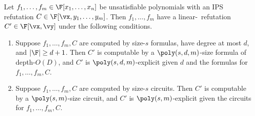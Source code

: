\documentclass{toc}
\begin{document}
\begin{proposition}\label{res:h-ips_v_ips}
        Let $f_1,\ldots,f_m\in\F[x_1,\ldots,x_n]$ be unsatisfiable polynomials with an IPS refutation $C\in\F[\vx,y_1,\ldots,y_m]$.  Then $f_1,\ldots,f_m$ have a linear-\IPS\ refutation $C'\in\F[\vx,\vy]$ under the following conditions.
        \begin{enumerate}
                \item Suppose $f_1,\ldots,f_m,C$ are computed by size-$s$ formulas, have degree at most $d$, and $|\F|\ge d+1$. Then $C'$ is computable by a $\poly(s,d,m)$-size formula of depth-$O(D)$, and $C'$ is $\poly(s,d,m)$-explicit given $d$ and the formulas for $f_1,\ldots,f_m,C$.
                        \label{res:h-ips_v_ips:formula}
                \item Suppose $f_1,\ldots,f_m,C$ are computed by size-$s$ circuits. Then $C'$ is computable by a $\poly(s,m)$-size circuit, and $C'$ is $\poly(s,m)$-explicit given the circuits for $f_1,\ldots,f_m,C$.
                        \label{res:h-ips_v_ips:circuit}
        \end{enumerate}
\end{proposition}
\end{document}
